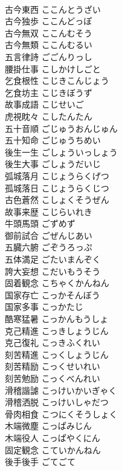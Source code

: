 \documentclass[8pt]{extreport}
\begin{document}
\begin{CJK}{UTF8}{min}
\\	古今東西	ここんとうざい	
\\	古今独歩	ここんどっぽ	
\\	古今無双	ここんむそう	
\\	古今無類	ここんむるい	
\\	五言律詩	ごごんりっし	
\\	腰掛仕事	こしかけしごと	
\\	乞食根性	こじきこんじょう	
\\	乞食坊主	こじきぼうず	
\\	故事成語	こじせいご	
\\	虎視眈々	こしたんたん	
\\	五十音順	ごじゅうおんじゅん	
\\	五十知命	ごじゅうちめい	
\\	後生一生	ごしょういっしょう	
\\	後生大事	ごしょうだいじ	
\\	弧城落月	こじょうらくげつ	
\\	孤城落日	こじょうらくじつ	
\\	古色蒼然	こしょくそうぜん	
\\	故事来歴	こじらいれき	
\\	牛頭馬頭	ごずめず	
\\	御前試合	ごぜんじあい	
\\	五臓六腑	ごぞうろっぷ	
\\	五体満足	ごたいまんぞく	
\\	誇大妄想	こだいもうそう	
\\	固着観念	こちゃくかんねん	
\\	国家存亡	こっかそんぼう	
\\	国家多事	こっかたじ	
\\	酷寒猛暑	こっかんもうしょ	
\\	克己精進	こっきしょうじん	
\\	克己復礼	こっきふくれい	
\\	刻苦精進	こっくしょうじん	
\\	刻苦精励	こっくせいれい	
\\	刻苦勉励	こっくべんれい	
\\	滑稽諧謔	こっけいかいぎゃく	
\\	滑稽洒脱	こっけいしゃだつ	
\\	骨肉相食	こつにくそうしょく	
\\	木端微塵	こっぱみじん	
\\	木端役人	こっぱやくにん	
\\	固定観念	こていかんねん	
\\	後手後手	ごてごて	

\end{CJK}
\end{document}
